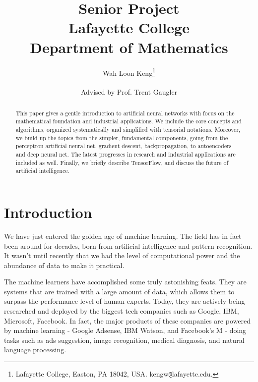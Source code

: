 \documentclass[12pt]{article}  %
\begin{document}
\title{Senior Project\\
Lafayette College \\
Department of Mathematics
}

\author{
{Wah Loon Keng}\thanks{
Lafayette College,
Easton, PA 18042, USA.
kengw{\tt @}lafayette.edu.}
\\
\\
{Advised by Prof. Trent Gaugler}
}
\maketitle


\begin{abstract}

This paper gives a gentle introduction to artificial neural networks with focus on the mathematical foundation and industrial applications. We include the core concepts and algorithms, organized systematically and simplified with tensorial notations. Moreover, we build up the topics from the simpler, fundamental components, going from the perceptron artificial neural net, gradient descent, backpropagation, to autoencoders and deep neural net. The latest progresses in research and industrial applications are included as well. Finally, we briefly describe TensorFlow, and discuss the future of artificial intelligence.
\end{abstract}


\clearpage
\tableofcontents
\clearpage






\section{Introduction} \label{intro}

We have just entered the golden age of machine learning. The field has in fact been around for decades, born from artificial intelligence and pattern recognition. It wasn't until recently that we had the level of computational power and the abundance of data to make it practical. 

The machine learners have accomplished some truly astonishing feats. They are systems that are trained with a large amount of data, which allows them to surpass the performance level of human experts. Today, they are actively being researched and deployed by the biggest tech companies such as Google, IBM, Microsoft, Facebook. In fact, the major products of these companies are powered by machine learning - Google Adsense, IBM Watson, and Facebook's M - doing tasks such as ads suggestion, image recognition, medical diagnosis, and natural language processing.
\end{document}
